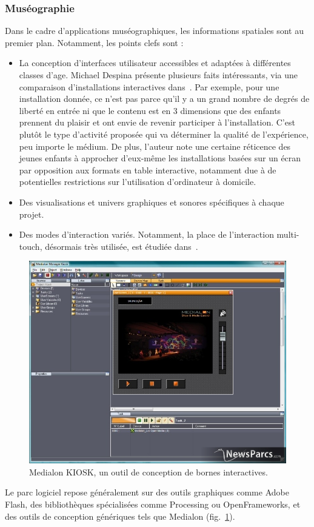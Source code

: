 \documentclass[french,12pt]{article}
\begin{document}
\subsubsection{Muséographie}
Dans le cadre d'applications muséographiques, les informations spatiales sont au premier plan. Notamment, les points clefs sont : 
\begin{itemize}
    \item La conception d'interfaces utilisateur accessibles et adaptées à différentes classes d'age. 
    Michael Despina présente plusieurs faits intéressants, via une comparaison d'installations interactives dans~\cite{michael_comparative_2010}. Par exemple, pour une installation donnée, ce n'est pas parce qu'il y a un grand nombre de degrés de liberté en entrée ni que le contenu est en 3 dimensions que des enfants prennent du plaisir et ont envie de revenir participer à l'installation. C'est plutôt le type d'activité proposée qui va déterminer la qualité de l'expérience, peu importe le médium. De plus, l'auteur note une certaine réticence des jeunes enfants à approcher d'eux-même les installations basées sur un écran par opposition aux formats en table interactive, notamment due à de potentielles restrictions sur l'utilisation d'ordinateur à domicile.
    \item Des visualisations et univers graphiques et sonores spécifiques à chaque projet.
    \item Des modes d'interaction variés. Notamment, la place de l'interaction multi-touch, désormais très utilisée, est étudiée dans~\cite{kidd_multi-touch_2011}.
\end{itemize}

\begin{figure}[h]
    \centering
    \includegraphics[scale=0.25]{images/medialon.jpg}
    \caption{Medialon KIOSK, un outil de conception de bornes interactives.}
    \label{fig.medialon}
\end{figure}
Le parc logiciel repose généralement sur des outils graphiques comme Adobe Flash, des bibliothèques spécialisées comme Processing ou OpenFrameworks, et des outils de conception génériques tels que Medialon (fig.~\ref{fig.medialon}).
\end{document}
